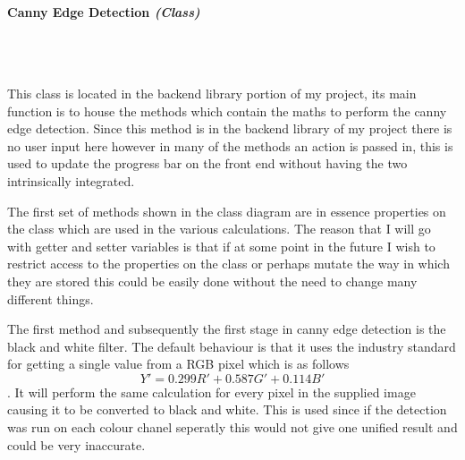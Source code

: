 \begin{FlushLeft}
    \bk

    \paragraph{Canny Edge Detection \textit{(Class)}} \mbox{} \\

    \begin{figure}[H]
        \centering
    \end{figure}\\

    This class is located in the backend library portion of my project, its main function is to house the methods which contain the maths to perform the canny edge detection. Since this method is in the backend library of my project there is no user input here however in many of the methods an action is passed in, this is used to update the progress bar on the front end without having the two intrinsically integrated. \\ \bk

    The first set of methods shown in the class diagram are in essence properties on the class which are used in the various calculations. The reason that I will go with getter and setter variables is that if at some point in the future I wish to restrict access to the properties on the class or perhaps mutate the way in which they are stored this could be easily done without the need to change many different things. \\ \bk

    The first method and subsequently the first stage in canny edge detection is the black and white filter. The default behaviour is that it uses the industry standard for getting a single value from a RGB pixel which is as follows $$ Y' = 0.299R' + 0.587G' + 0.114B' $$.  It will perform the same calculation for every pixel in the supplied image causing it to be converted to black and white. This is used since if the detection was run on each colour chanel seperatly this would not give one unified result and could be very inaccurate.\\ 


\end{FlushLeft}
